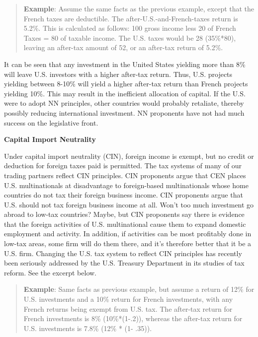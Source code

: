 \begin{quote}
\textbf{Example}:  Assume the same facts as the previous example, except that the French taxes are deductible.  The after-U.S.-and-French-taxes return is 5.2\%. This is calculated as follows:  100 gross income less 20 of French Taxes = 80 of taxable income.  The U.S. taxes would be 28 (35\%*80), leaving an after-tax amount of 52, or an after-tax return of 5.2\%. 
\end{quote}

It can be seen that any investment in the United States yielding more than 8\% will leave U.S. investors with a higher after-tax return.  Thus, U.S. projects yielding between 8-10\% will yield a higher after-tax return than French projects yielding 10\%.  This may result in the inefficient allocation of capital.  If the U.S. were to adopt NN principles, other countries would probably retaliate, thereby possibly reducing international investment.  NN proponents have not had much success on the legislative front.  		

\begin{center}
    		\textbf{Capital Import Neutrality}	
\end{center}

Under capital import neutrality (CIN), foreign income is exempt, but no credit or deduction for foreign taxes paid is permitted.  The tax systems of many of our trading partners reflect CIN principles.  CIN proponents argue that CEN places U.S. multinationals at disadvantage to foreign-based multinationals whose home countries do not tax their foreign business income.  CIN proponents argue that U.S. should not tax foreign business income at all.  Won't too much investment go abroad to low-tax countries?  Maybe, but CIN proponents say there is evidence that the foreign activities of U.S. multinational cause them to expand domestic employment and activity.  In addition, if activities can be most profitably done in low-tax areas, some firm will do them there, and it's therefore better that it be a U.S. firm.  Changing the U.S. tax system to reflect CIN principles has recently been seriously addressed by the U.S. Treasury Department in its studies of tax reform.  See the excerpt below.
  
\begin{quote}  
\textbf{Example}:  Same facts as previous example, but assume a return of 12\% for U.S. investments and a 10\% return for French investments, with any French returns being exempt from U.S. tax.  The after-tax return for French investments is 8\% (10\%*(1-.2)), whereas the after-tax return for U.S. investments is 7.8\% (12\% * (1- .35)).
\end{quote}

